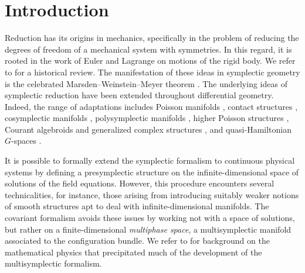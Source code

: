 \documentclass[pdftex]{sigma}
\numberwithin{equation}{section}
\begin{document}





\section{Introduction}

Reduction has its origins in mechanics, specifically in the problem of reducing the degrees of freedom of a mechanical system with symmetries. In this regard, it is rooted in the work of Euler and Lagrange on motions of the rigid body. We refer to \cite{CendraMarsdenRatiu01, MarsdenWeinstein01} for a historical review. The manifestation of these ideas in symplectic geometry is the celebrated Marsden--Weinstein--Meyer theorem \cite{MarsdenWeinstein74,Meyer73}. The underlying ideas of symplectic reduction have been extended throughout differential geometry. Indeed, the range of adaptations includes Poisson manifolds \cite{MarsdenRatiu86,Willett02}, contact structures \cite{deLeonLainzValcazar19,Willett02}, cosymplectic manifolds \cite{Albert89}, polysymplectic manifolds \cite{MarreroRoman-RoySalgadoVilarino15}, higher Poisson structures \cite{BursztynMartinezAlbaRubio19}, Courant algebroids and generalized complex structures \cite{BursztynCavalcantiGualtieri07,StienonXu08,Vaisman07}, and quasi-Hamiltonian $G$-spaces \cite{AlekseevMalkinMeinrenken98}.


It is possible to formally extend the symplectic formalism to continuous physical systems by defining a presymplectic structure on the infinite-dimensional space of solutions of the field equations.
However, this procedure encounters several technicalities, for instance, those arising from introducing suitably weaker notions of smooth structures apt to deal with infinite-dimensional manifolds.
The covariant formalism avoids these issues by working not with a space of solutions, but rather on a finite-dimensional \emph{multiphase space}, a multisymplectic manifold associated to the configuration bundle.
We refer to \cite{GotayIsenbergMarsden04, GotayIsenbergMarsdenMontgomery98,Helein12,Kijowski73} for background on the mathematical physics that precipitated much of the development of the multisymplectic formalism.
\end{document}
